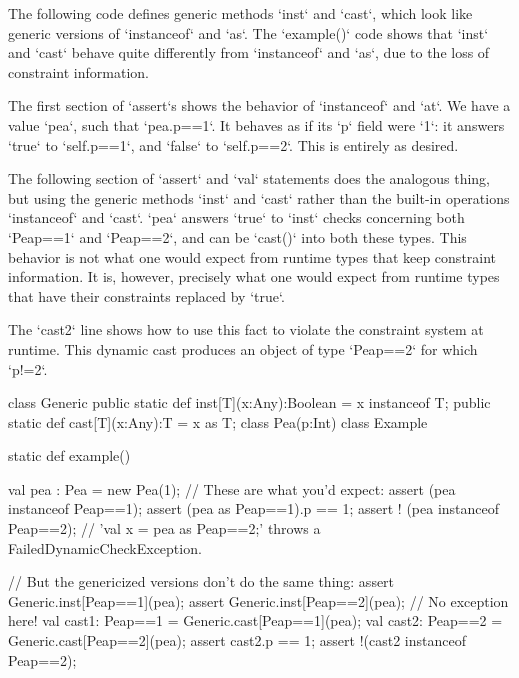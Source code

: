 \begin{ex}
The following code defines generic methods \xcd`inst` and \xcd`cast`, which
look like generic versions of \xcd`instanceof` and \xcd`as`.  The
\xcd`example()` code shows that \xcd`inst` and \xcd`cast` behave quite
differently from \xcd`instanceof` and \xcd`as`, due to the loss of constraint
information.  

The first section of \xcd`assert`s shows the behavior of \xcd`instanceof` and
\xcd`at`.  We have a value \xcd`pea`, such that \xcd`pea.p==1`.
It behaves as if its \xcd`p` field were \xcd`1`: it answers \xcd`true` to 
\xcd`self.p==1`, and \xcd`false` to \xcd`self.p==2`.  This is entirely as
desired.

The following section of \xcd`assert` and \xcd`val` statements does the
analogous thing, but using the generic methods \xcd`inst` and \xcd`cast`
rather than the built-in operations \xcd`instanceof` and \xcd`cast`.
\xcd`pea` answers \xcd`true` to \xcd`inst` checks concerning both
\xcd`Pea{p==1}` and \xcd`Pea{p==2}`, and can be \xcd`cast()` into both these
types.  This behavior is not what one would expect from runtime types that
keep constraint information.  It is, however, precisely what one would expect
from runtime types that have their constraints replaced by \xcd`true`.  

The \xcd`cast2` line shows how to use this fact to violate the constraint
system at runtime.   This dynamic cast produces an object of type
\xcd`Pea{p==2}` for which \xcd`p!=2`.  

\begin{xten}
class Generic {
  public static def inst[T](x:Any):Boolean = x instanceof T;
  public static def cast[T](x:Any):T       = x as T;
}
class Pea(p:Int) {}
class Example{
  static def example() {
     val pea : Pea = new Pea(1);
     // These are what you'd expect: 
     assert (pea instanceof Pea{p==1});
     assert (pea as Pea{p==1}).p == 1;
     assert ! (pea instanceof Pea{p==2}); 
     // 'val x = pea as Pea{p==2};' throws a FailedDynamicCheckException.

     // But the genericized versions don't do the same thing:
     assert Generic.inst[Pea{p==1}](pea);
     assert Generic.inst[Pea{p==2}](pea);
     // No exception here!
     val cast1: Pea{p==1} = Generic.cast[Pea{p==1}](pea);
     val cast2: Pea{p==2} = Generic.cast[Pea{p==2}](pea);
     assert cast2.p == 1;
     assert !(cast2 instanceof Pea{p==2});
  }
}

\end{xten}
\end{ex}

